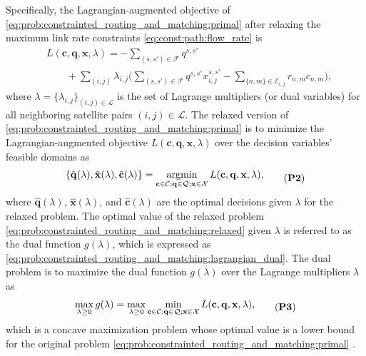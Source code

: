 \documentclass[journal]{IEEEtran}
\DeclareMathOperator*{\argmin}{\arg\!\min}
\begin{document}
Specifically, the Lagrangian-augmented objective of \eqref{eq:prob:constrainted_routing_and_matching:primal} after relaxing the maximum link rate constraints \eqref{eq:const:path:flow_rate} is
\begin{equation}\label{eq:prob:constrainted_routing_and_matching:lagrangian}
  \begin{aligned}
      &L(\mathbf{c}, \mathbf{q}, \mathbf{x}, \lambda) = -\sum_{(s,s')\in\mathcal{F} } q^{s,s'} \\
      &\qquad + \sum_{(i,j)}\lambda_{i,j} \Big(\sum_{(s,s')\in \mathcal{F}} q^{s,s'} x^{s,s'}_{i,j} - \sum_{\{n,m\}\in\mathcal{E}_{i,j}} r_{n,m} c_{n,m} \Big) ,
  \end{aligned}
\end{equation}
where $\lambda=\{\lambda_{i,j}\}_{(i,j)\in\mathcal{L}}$ is the set of Lagrange multipliers (or dual variables) for all neighboring satellite pairs $(i,j)\in\mathcal{L}$.
The relaxed version of \eqref{eq:prob:constrainted_routing_and_matching:primal} is to minimize the Lagrangian-augmented objective $L(\mathbf{c}, \mathbf{q}, \mathbf{x}, \lambda)$ over the decision variables' feasible domains as
\begin{equation}\label{eq:prob:constrainted_routing_and_matching:relaxed}
  \begin{aligned}
  \{  \hat{\mathbf{q}}(\lambda), \hat{\mathbf{x}}(\lambda), \hat{\mathbf{c}}(\lambda) \}= \argmin_{
      \substack{
        \mathbf{c}\in\mathcal{C};\mathbf{q}\in\mathcal{Q};\mathbf{x}\in\mathcal{X}
      }
    }
    L(\mathbf{c}, \mathbf{q}, \mathbf{x}, \lambda),
  \end{aligned}
  \tag{\textbf{P2}}
\end{equation}
where $\hat{\mathbf{q}}(\lambda)$, $\hat{\mathbf{x}}(\lambda)$, and $\hat{\mathbf{c}}(\lambda)$ are the optimal decisions given $\lambda$ for the relaxed problem.
The optimal value of the relaxed problem \eqref{eq:prob:constrainted_routing_and_matching:relaxed} given $\lambda$ is referred to as the dual function $g(\lambda)$, which is expressed as \eqref{eq:prob:constrainted_routing_and_matching:lagrangian_dual}.
The dual problem is to maximize the dual function $g(\lambda)$ over the Lagrange multipliers $\lambda$ as
\begin{equation}\label{eq:prob:constrainted_routing_and_matching:dual}
  \begin{aligned}
    \max_{\lambda\geq 0} g(\lambda) = \max_{\lambda\geq 0} \min_{
      \substack{
        \mathbf{c}\in\mathcal{C};\mathbf{q}\in\mathcal{Q};\mathbf{x}\in\mathcal{X}
      }
    }
    L(\mathbf{c}, \mathbf{q}, \mathbf{x}, \lambda),
  \end{aligned}
\tag{\textbf{P3}}
\end{equation}
which is a concave maximization problem whose optimal value is a lower bound for the original problem \eqref{eq:prob:constrainted_routing_and_matching:primal} \cite{fisher2004lagrangian}.
\end{document}
